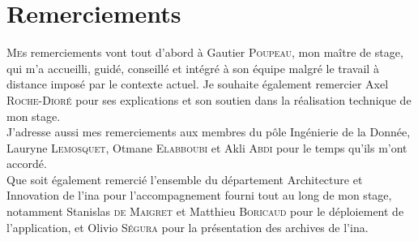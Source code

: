 	\chapter*{Remerciements}
	
	\lettrine{M}es remerciements vont tout d'abord à Gautier \textsc{Poupeau}, mon maître de stage, qui m'a accueilli, guidé, conseillé et intégré à son équipe malgré le travail à distance imposé par le contexte actuel. Je souhaite également remercier Axel \textsc{Roche-Dioré} pour ses explications et son soutien dans la réalisation technique de mon stage.\\
	
	J'adresse aussi mes remerciements aux membres du pôle \og Ingénierie de la Donnée\fg{}, Lauryne \textsc{Lemosquet}, Otmane \textsc{Elabboubi} et Akli \textsc{Abdi} pour le temps qu'ils m'ont accordé. \\
	
	Que soit également remercié l'ensemble du département \og Architecture et Innovation\fg{} de l'\ac{ina} pour l'accompagnement fourni tout au long de mon stage, notamment Stanislas \textsc{de Maigret} et Matthieu \textsc{Boricaud} pour le déploiement de l'application, et Olivio \textsc{Ségura} pour la présentation des archives de l'\ac{ina}.